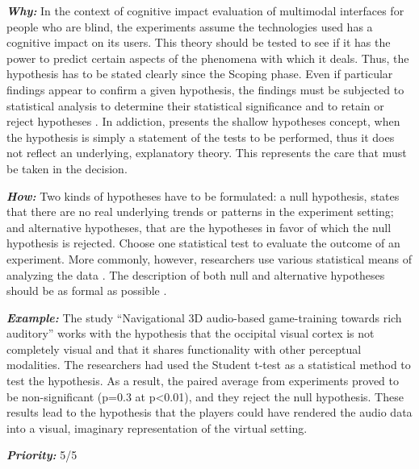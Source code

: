 \noindent \textit{\textbf{Why:}} In the context of cognitive impact evaluation of multimodal interfaces for people who are blind, the experiments assume the technologies used has a cognitive impact on its users. This theory should be tested to see if it has the power to predict certain aspects of the phenomena with which it deals. Thus, the hypothesis has to be stated clearly since the Scoping phase. Even if particular findings appear to confirm a given hypothesis, the findings must be subjected to statistical analysis to determine their statistical significance and to retain or reject hypotheses \cite{Sternberg2011}. In addiction,  presents the shallow hypotheses concept, when the hypothesis is simply a statement of the tests to be performed, thus it does not reflect an underlying, explanatory theory. This represents the care that must be taken in the decision.
\vspace{5mm}

\noindent \textit{\textbf{How:}} Two kinds of hypotheses have to be formulated: a null hypothesis, states that there are no real underlying trends or patterns in the experiment setting; and alternative hypotheses, that are the hypotheses in favor of which the null hypothesis is rejected.  Choose one statistical test to evaluate the outcome of an experiment. More commonly, however, researchers use various statistical means of analyzing the data \cite{Sternberg2011}. The description of both null and alternative hypotheses should be as formal as possible \cite{Jedlitschka2007}.
\vspace{5mm}

\noindent \textit{\textbf{Example:}} The study ``Navigational 3D audio-based game-training towards rich auditory'' \cite{Balan2014} works with the hypothesis that the occipital visual cortex is not completely visual and that it shares functionality with other perceptual modalities. The researchers had used the Student t-test as a statistical method to test the hypothesis. As a result, the paired average from experiments proved to be non-significant (p=0.3 at p<0.01), and they reject the null hypothesis. These results lead to the hypothesis that the players could have rendered the audio data into a visual, imaginary representation of the virtual setting.
\vspace{5mm}

\noindent \textit{\textbf{Priority:}} 5/5
\vspace{5mm}

